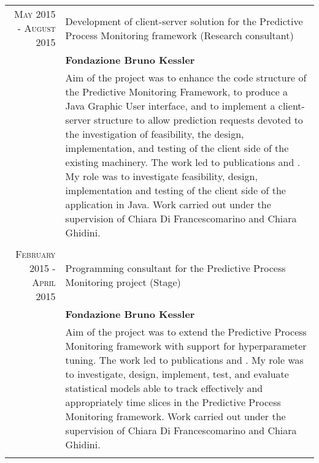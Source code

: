 \documentclass[a4paper,10pt]{article}
\begin{document}
\begin{longtable}{r|p{8.5cm}}
  \textsc{May 2015 - August 2015} & Development of client-server solution for the Predictive Process Monitoring framework (Research consultant) \\
 &\textbf{Fondazione Bruno Kessler}\\
 &\footnotesize{Aim of the project was to enhance the code structure of the Predictive Monitoring Framework, to produce a Java Graphic User interface, and to implement a client-server structure to allow prediction requests devoted to the investigation of feasibility, the design, implementation, and testing of the client side of the existing machinery. The work led to publications \cite{DBLP:conf/caise/Francescomarino16} and \cite{DBLP:conf/bpm/FedericiRFDGMT15}. My role was to investigate feasibility, design, implementation and testing of the client side of the application in Java. Work carried out under the supervision of Chiara Di Francescomarino and Chiara Ghidini.}\\\multicolumn{2}{c}{} \\
 
   \textsc{February 2015 - April 2015} & Programming consultant for the Predictive Process Monitoring project (Stage)\\
  &\textbf{Fondazione Bruno Kessler}\\
 &\footnotesize{Aim of the project was to extend the Predictive Process Monitoring framework with support for hyperparameter tuning. The work led to publications \cite{DBLP:journals/is/Francescomarino18} and \cite{DBLP:conf/caise/Francescomarino16}. My role was to investigate, design, implement, test, and evaluate statistical models able to track effectively and appropriately time slices in the Predictive Process Monitoring framework. Work carried out under the supervision of Chiara Di Francescomarino and Chiara Ghidini.}\\\multicolumn{2}{c}{} \\
 
\end{longtable}
\end{document}
